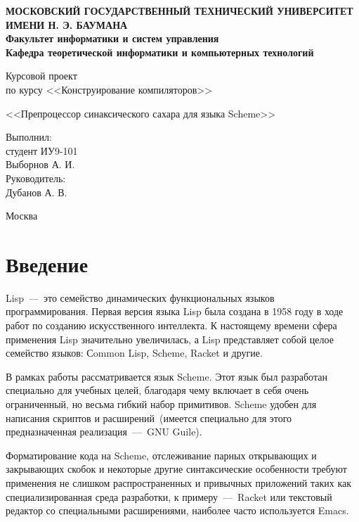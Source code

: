 \documentclass[12pt,a4paper,oneside]{extarticle}
\begin{document}
\pgfplotsset{compat=1.8}

\thispagestyle{empty}
\newpage
{
\centering


\textbf{
МОСКОВСКИЙ ГОСУДАРСТВЕННЫЙ ТЕХНИЧЕСКИЙ УНИВЕРСИТЕТ ИМЕНИ Н. Э. БАУМАНА \\
Факультет информатики и систем управления \\
Кафедра теоретической информатики и компьютерных технологий}
\bigskip
\bigskip
\bigskip
\bigskip
\bigskip
\bigskip
\bigskip

\vfill

Курсовой проект \\
по курсу <<Конструирование компиляторов>>

\bigskip

{\large <<Препроцессор синаксического сахара для языка Scheme>>}
\bigskip

\vfill



\hfill\parbox{4cm} {
Выполнил:\\
студент ИУ9-101 \hfill \\
Выборнов А. И.\hfill \medskip\\
Руководитель:\\
Дубанов А. В.\hfill
}


\vspace{\fill}

Москва \number\year
\clearpage
}


\tableofcontents

\clearpage

\section*{Введение}
    Lisp~---~это семейство динамических функциональных языков программирования.
    Первая версия языка Lisp была создана в 1958 году в ходе работ по созданию искусственного интеллекта.
    К настоящему времени сфера применения Lisp значительно увеличилась, а Lisp представляет собой целое семейство языков: Сommon Lisp, Scheme, Racket и другие. 

    В рамках работы рассматривается язык Scheme.
    Этот язык был разработан специально для учебных целей, благодаря чему включает в себя очень ограниченный, но весьма гибкий набор примитивов.
    Scheme удобен для написания скриптов и расширений~(имеется специально для этого предназначенная реализация~---~GNU Guile).

    Форматирование кода на Scheme, отслеживание парных открывающих и закрывающих скобок и некоторые другие синтаксические особенности требуют применения не слишком распространенных и привычных приложений таких как специализированная среда разработки, к примеру~---~Racket или текстовый редактор со специальными расширениями, наиболее часто используется Emacs. 
\end{document}
